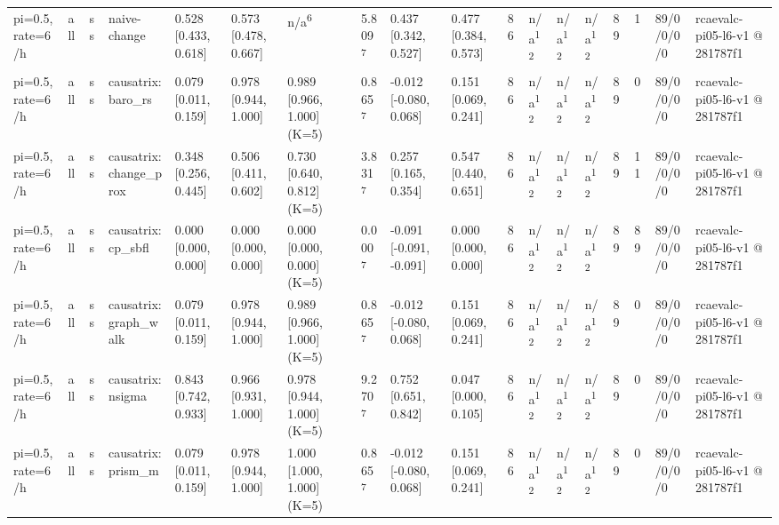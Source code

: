 \begin{table}[t]
\begin{tabular}{llllllllllllllllll}
pi=0.5, rate=6/h & all & ss & naive-change & 0.528 [0.433, 0.618] & 0.573 [0.478, 0.667] & n/a\textsuperscript{6} & 5.809\textsuperscript{7} & 0.437 [0.342, 0.527] & 0.477 [0.384, 0.573] & 86 & n/a\textsuperscript{12} & n/a\textsuperscript{12} & n/a\textsuperscript{12} & 89 & 1 & 89/0/0/0/0 & rcaevalc-pi05-l6-v1 @ 281787f1 \\
pi=0.5, rate=6/h & all & ss & causatrix:baro\_rs & 0.079 [0.011, 0.159] & 0.978 [0.944, 1.000] & 0.989 [0.966, 1.000] (K=5) & 0.865\textsuperscript{7} & -0.012 [-0.080, 0.068] & 0.151 [0.069, 0.241] & 86 & n/a\textsuperscript{12} & n/a\textsuperscript{12} & n/a\textsuperscript{12} & 89 & 0 & 89/0/0/0/0 & rcaevalc-pi05-l6-v1 @ 281787f1 \\
pi=0.5, rate=6/h & all & ss & causatrix:change\_prox & 0.348 [0.256, 0.445] & 0.506 [0.411, 0.602] & 0.730 [0.640, 0.812] (K=5) & 3.831\textsuperscript{7} & 0.257 [0.165, 0.354] & 0.547 [0.440, 0.651] & 86 & n/a\textsuperscript{12} & n/a\textsuperscript{12} & n/a\textsuperscript{12} & 89 & 11 & 89/0/0/0/0 & rcaevalc-pi05-l6-v1 @ 281787f1 \\
pi=0.5, rate=6/h & all & ss & causatrix:cp\_sbfl & 0.000 [0.000, 0.000] & 0.000 [0.000, 0.000] & 0.000 [0.000, 0.000] (K=5) & 0.000\textsuperscript{7} & -0.091 [-0.091, -0.091] & 0.000 [0.000, 0.000] & 86 & n/a\textsuperscript{12} & n/a\textsuperscript{12} & n/a\textsuperscript{12} & 89 & 89 & 89/0/0/0/0 & rcaevalc-pi05-l6-v1 @ 281787f1 \\
pi=0.5, rate=6/h & all & ss & causatrix:graph\_walk & 0.079 [0.011, 0.159] & 0.978 [0.944, 1.000] & 0.989 [0.966, 1.000] (K=5) & 0.865\textsuperscript{7} & -0.012 [-0.080, 0.068] & 0.151 [0.069, 0.241] & 86 & n/a\textsuperscript{12} & n/a\textsuperscript{12} & n/a\textsuperscript{12} & 89 & 0 & 89/0/0/0/0 & rcaevalc-pi05-l6-v1 @ 281787f1 \\
pi=0.5, rate=6/h & all & ss & causatrix:nsigma & 0.843 [0.742, 0.933] & 0.966 [0.931, 1.000] & 0.978 [0.944, 1.000] (K=5) & 9.270\textsuperscript{7} & 0.752 [0.651, 0.842] & 0.047 [0.000, 0.105] & 86 & n/a\textsuperscript{12} & n/a\textsuperscript{12} & n/a\textsuperscript{12} & 89 & 0 & 89/0/0/0/0 & rcaevalc-pi05-l6-v1 @ 281787f1 \\
pi=0.5, rate=6/h & all & ss & causatrix:prism\_m & 0.079 [0.011, 0.159] & 0.978 [0.944, 1.000] & 1.000 [1.000, 1.000] (K=5) & 0.865\textsuperscript{7} & -0.012 [-0.080, 0.068] & 0.151 [0.069, 0.241] & 86 & n/a\textsuperscript{12} & n/a\textsuperscript{12} & n/a\textsuperscript{12} & 89 & 0 & 89/0/0/0/0 & rcaevalc-pi05-l6-v1 @ 281787f1 \\

\end{tabular}
\end{table}

